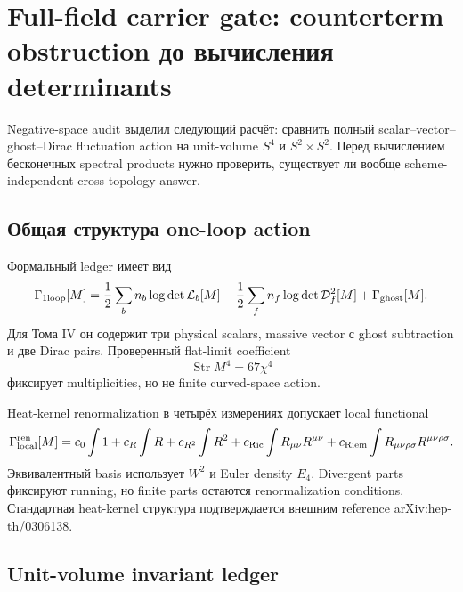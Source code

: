 \chapter[Full-field carrier gate: counterterm obstruction]{Full-field carrier
gate: counterterm obstruction до вычисления determinants}

Negative-space audit выделил следующий расчёт: сравнить полный
scalar--vector--ghost--Dirac fluctuation action на unit-volume \(S^4\) и
\(S^2\times S^2\). Перед вычислением бесконечных spectral products нужно
проверить, существует ли вообще scheme-independent cross-topology answer.

\section{Общая структура one-loop action}

Формальный ledger имеет вид
\begin{equation}
 \Gamma_{\rm 1loop}[M]
 =\frac12\sum_b n_b\log\det\mathcal L_b[M]
 -\frac12\sum_f n_f\log\det\mathcal D_f^2[M]
 +\Gamma_{\rm ghost}[M].
 \label{eq:full-field-one-loop-ledger}
\end{equation}
Для Тома IV он содержит три physical scalars, massive vector с ghost
subtraction и две Dirac pairs. Проверенный flat-limit coefficient
\begin{equation}
 \operatorname{Str}M^4=67\chi^4
\end{equation}
фиксирует multiplicities, но не finite curved-space action.

Heat-kernel renormalization в четырёх измерениях допускает local functional
\begin{equation}
 \Gamma_{\rm local}^{\rm ren}[M]
 =c_0\int1+c_R\int R
 +c_{R^2}\int R^2+c_{\rm Ric}\int R_{\mu\nu}R^{\mu\nu}
 +c_{\rm Riem}\int R_{\mu\nu\rho\sigma}R^{\mu\nu\rho\sigma}.
 \label{eq:curved-counterterm-basis}
\end{equation}
Эквивалентный basis использует \(W^2\) и Euler density \(E_4\). Divergent
parts фиксируют running, но finite parts остаются renormalization conditions.
Стандартная heat-kernel структура подтверждается внешним reference
arXiv:hep-th/0306138.

\section{Unit-volume invariant ledger}

